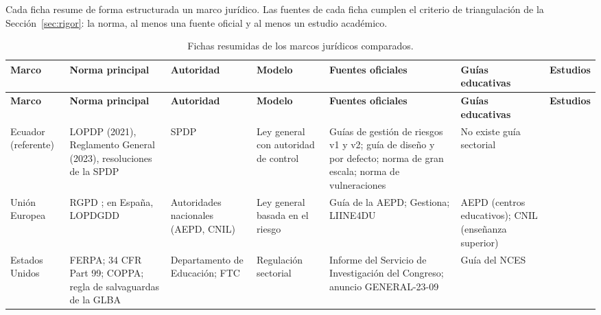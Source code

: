 \label{anx:fichas}

Cada ficha resume de forma estructurada un marco jurídico. Las fuentes de cada ficha cumplen el criterio de triangulación de la Sección~\ref{sec:rigor}: la norma, al menos una fuente oficial y al menos un estudio académico.

{\scriptsize
\renewcommand{\arraystretch}{1.15}
\begin{xltabular}{\textwidth}{|>{\raggedright\arraybackslash}p{1.4cm}|>{\raggedright\arraybackslash}X|>{\raggedright\arraybackslash}p{1.7cm}|>{\raggedright\arraybackslash}p{1.4cm}|>{\raggedright\arraybackslash}X|>{\raggedright\arraybackslash}p{1.9cm}|>{\raggedright\arraybackslash}p{1.5cm}|}
  \caption{Fichas resumidas de los marcos jurídicos comparados.}
  \label{tab:fichas_marcos} \\
  \hline
  \textbf{Marco} & \textbf{Norma principal} & \textbf{Autoridad} & \textbf{Modelo} & \textbf{Fuentes oficiales} & \textbf{Guías educativas} & \textbf{Estudios} \\
  \hline
  \endfirsthead
  \hline
  \textbf{Marco} & \textbf{Norma principal} & \textbf{Autoridad} & \textbf{Modelo} & \textbf{Fuentes oficiales} & \textbf{Guías educativas} & \textbf{Estudios} \\
  \hline
  \endhead
  \hline
  \endlastfoot
  Ecuador (referente) & LOPDP (2021), Reglamento General (2023), resoluciones de la SPDP \cite{lopdp2021,rlopdp2023} & SPDP & Ley general con autoridad de control & Guías de gestión de riesgos v1 y v2; guía de diseño y por defecto; norma de gran escala; norma de vulneraciones \cite{spdp2025guia,spdp2026guiav2,spdp2025diseno,spdp2026granescala,spdp2026vulneraciones} & No existe guía sectorial & \cite{alvarez2024proteccion,piray2026garantias,echeverria2026riesgos,perezvaca2021,garcia2024rgpd,iza2023lopdp} \\ \hline
  Unión Europea & RGPD \cite{rgpd2016}; en España, LOPDGDD \cite{lopdgdd2018} & Autoridades nacionales (AEPD, CNIL) & Ley general basada en el riesgo & Guía de la AEPD; Gestiona; LIINE4DU \cite{aepd2021riesgo,aepd2024gestiona,aepd2024liine4du} & AEPD (centros educativos); CNIL (enseñanza superior) \cite{aepd2018centros,cnil2026superieur} & \cite{fpf2020gdpr,habbabeh2019assessment} \\ \hline
  Estados Unidos & FERPA; 34 CFR Part 99; COPPA; regla de salvaguardas de la GLBA \cite{ferpa1974,ferpa34cfr,coppa1998,ftc2021safeguards} & Departamento de Educación; FTC & Regulación sectorial & Informe del Servicio de Investigación del Congreso; anuncio GENERAL-23-09 \cite{crs2021ferpa,fsa2023glba} & Guía del NCES \cite{nces2004privacy} & \cite{parks2017ferpa} \\ \hline

\end{xltabular}}
